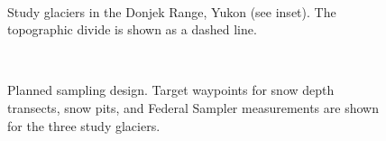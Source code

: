 \documentclass{sfuthesis}
\begin{document}
\begin{landscape}
\begin{figure}
	\centering
	\\
	\caption{Study glaciers in the Donjek Range, Yukon (see inset). The topographic divide is shown as a dashed line.}
	\label{studysites}
\end{figure}

\begin{figure}
	\centering
	\\
	\caption{Planned sampling design. Target waypoints for snow depth transects, snow pits, and Federal Sampler measurements are shown for the three study glaciers.}
	\label{transect_planned}
	\end{figure}


\end{landscape}
\end{document}
